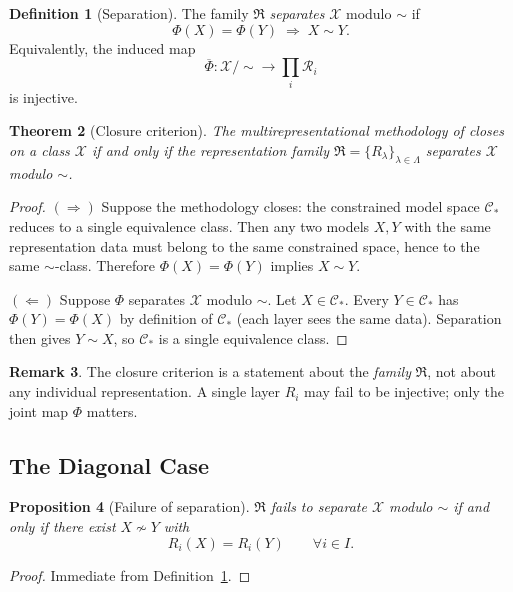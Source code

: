 \documentclass[11pt,a4paper]{article}
\theoremstyle{definition}
\newtheorem{definition}{Definition}[section]
\newtheorem{remark}[definition]{Remark}
\theoremstyle{plain}
\newtheorem{proposition}[definition]{Proposition}
\newtheorem{theorem}[definition]{Theorem}
\newcommand{\Lam}{\Lambda}
\newcommand{\Rcal}{\mathcal{R}}
\newcommand{\Ccal}{\mathcal{C}}
\newcommand{\Xcal}{\mathcal{X}}
\newcommand{\Rfrak}{\mathfrak{R}}
\newcommand{\Phimap}{\Phi}
\newcommand{\simadm}{\sim}
\begin{document}
\begin{definition}[Separation]\label{def:separation}
The family $\Rfrak$ \emph{separates} $\Xcal$ modulo $\simadm$ if
\[
  \Phimap(X) = \Phimap(Y)
  \;\Longrightarrow\;
  X \simadm Y .
\]
Equivalently, the induced map
\[
  \overline{\Phimap} : \Xcal / \simadm \longrightarrow \prod_i \Rcal_i
\]
is injective.
\end{definition}

\begin{theorem}[Closure criterion]\label{thm:closure}
The multirepresentational methodology of \cite{paperI} closes on a
class $\Xcal$ if and only if the representation family
$\Rfrak = \{R_\lambda\}_{\lambda \in \Lam}$ separates $\Xcal$
modulo $\simadm$.
\end{theorem}

\begin{proof}
$(\Rightarrow)$ Suppose the methodology closes: the constrained
model space $\Ccal_\ast$ reduces to a single equivalence class.
Then any two models $X, Y$ with the same representation data must
belong to the same constrained space, hence to the same
$\simadm$-class. Therefore $\Phimap(X) = \Phimap(Y)$ implies
$X \simadm Y$.

$(\Leftarrow)$ Suppose $\Phimap$ separates $\Xcal$ modulo
$\simadm$. Let $X \in \Ccal_\ast$. Every $Y \in \Ccal_\ast$ has
$\Phimap(Y) = \Phimap(X)$ by definition of $\Ccal_\ast$ (each layer
sees the same data). Separation then gives $Y \simadm X$, so
$\Ccal_\ast$ is a single equivalence class.
\end{proof}

\begin{remark}
The closure criterion is a statement about the \emph{family}
$\Rfrak$, not about any individual representation. A single layer
$R_i$ may fail to be injective; only the joint map $\Phimap$
matters.
\end{remark}

\subsection{The Diagonal Case}

\begin{proposition}[Failure of separation]\label{prop:failure-sep}
$\Rfrak$ fails to separate $\Xcal$ modulo $\simadm$ if and only if
there exist $X \not\simadm Y$ with
\[
  R_i(X) = R_i(Y) \qquad \forall i \in I .
\]
\end{proposition}

\begin{proof}
Immediate from Definition~\ref{def:separation}.
\end{proof}
\end{document}
